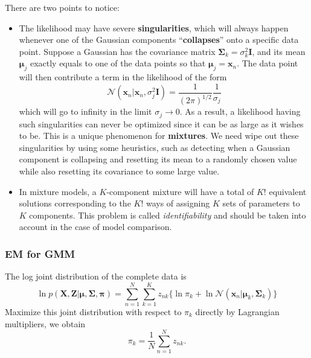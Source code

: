 \documentclass[a4paper]{report}
\renewcommand{\bf}{\mathbf}
\renewcommand{\cal}{\mathcal}
\newcommand{\imp}[1]{{\color{blue}\textit{#1}}}
\newcommand{\bs}{\boldsymbol}
\begin{document}
There are two points to notice:
\begin{itemize}
\item The likelihood may have severe \textbf{singularities}, which will always happen whenever one of the Gaussian components ``\textbf{collapses}'' onto a specific data point. Suppose a Gaussian has the covariance matrix $\bs{\Sigma}_k = \sigma_k^2 \bf{I}$, and its mean $\bs{\mu}_j$ exactly equals to one of the data points so that $\bs{\mu}_j = \bf{x}_n$. The data point will then contribute a term in the likelihood of the form
\begin{equation}
	\cal{N}(\bf{x}_n|\bf{x}_n,\sigma_j^2 \bf{I}) = \frac{1}{(2\pi)^{1/2}}\frac{1}{\sigma_j}
\end{equation}
which will go to infinity in the limit $\sigma_j \rightarrow 0$. As a result, a likelihood having such singularities can never be optimized since it can be as large as it wishes to be. This is a unique phenomenon for \textbf{mixtures}. We need wipe out these singularities by using some heuristics, such as detecting when a Gaussian component is collapsing and resetting its mean to a randomly chosen value while also resetting its covariance to some large value.
\item In mixture models, a $K$-component mixture will have a total of $K!$ equivalent solutions corresponding to the $K!$ ways of assigning $K$ sets of parameters to $K$ components. This problem is called \imp{identifiability} and should be taken into account in the case of model comparison.
\end{itemize}
\subsubsection{EM for GMM}
The log joint distribution of the complete data is 
\begin{equation}
	\ln p(\bf{X,Z}|\bs{\mu,\Sigma,\pi}) = \sum_{n=1}^N \sum_{k=1}^K z_{nk}\{ \ln \pi_k +\ln \cal{N}(\bf{x}_n|\bs{\mu}_k,\bs{\Sigma}_k)\}
\end{equation}
Maximize this joint distribution with respect to $\pi_k$ directly by Lagrangian multipliers, we obtain
\begin{equation}
	\pi_k = \frac{1}{N} \sum_{n=1}^N z_{nk}.
\end{equation}
\end{document}
